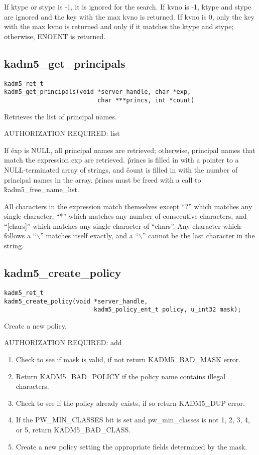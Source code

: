If ktype or stype is -1, it is ignored for the search.  If kvno is -1,
ktype and stype are ignored and the key with the max kvno is returned.
If kvno is 0, only the key with the max kvno is returned and only if
it matches the ktype and stype; otherwise, ENOENT is returned.

\subsection{kadm5_get_principals}

\begin{verbatim}
kadm5_ret_t
kadm5_get_principals(void *server_handle, char *exp,
                          char ***princs, int *count)
\end{verbatim}

Retrieves the list of principal names.  

AUTHORIZATION REQUIRED: list

If \v{exp} is NULL, all principal names are retrieved; otherwise,
principal names that match the expression exp are retrieved.
\v{princs} is filled in with a pointer to a NULL-terminated array of
strings, and \v{count} is filled in with the number of principal names
in the array.  \v{princs} must be freed with a call to
\v{kadm5_free_name_list}.

All characters in the expression match themselves except ``?'' which
matches any single character, ``*'' which matches any number of
consecutive characters, and ``[chars]'' which matches any single
character of ``chars''. Any character which follows a ``$\backslash$''
matches itself exactly, and a ``$\backslash$'' cannot be the last
character in the string.

\subsection{kadm5_create_policy}

\begin{verbatim}
kadm5_ret_t
kadm5_create_policy(void *server_handle,
                         kadm5_policy_ent_t policy, u_int32 mask); 
\end{verbatim}

Create a new policy.

AUTHORIZATION REQUIRED: add

\begin{enumerate}
\item Check to see if mask is valid, if not return KADM5_BAD_MASK error.
\item Return KADM5_BAD_POLICY if the policy name contains illegal
characters.

\item Check to see if the policy already exists, if so return
KADM5_DUP error. 
\item If the PW_MIN_CLASSES bit is set and pw_min_classes is not 1, 2,
3, 4, or 5, return KADM5_BAD_CLASS.
\item Create a new policy setting the appropriate fields determined
by the mask.
\end{enumerate}

